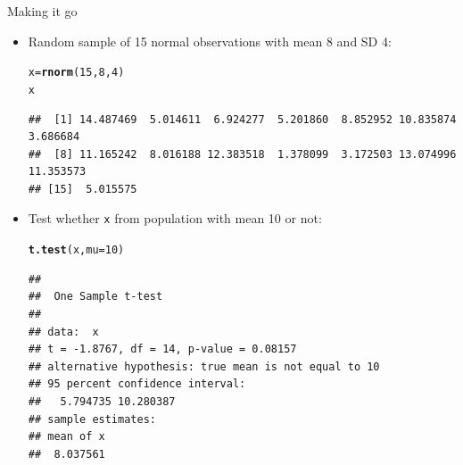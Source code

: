 \documentclass[unknownkeysallowed]{beamer}\usepackage[]{graphicx}\usepackage[]{color}
\makeatletter
\newcommand{\hlnum}[1]{\textcolor[rgb]{0.686,0.059,0.569}{#1}}%
\newcommand{\hlstd}[1]{\textcolor[rgb]{0.345,0.345,0.345}{#1}}%
\newcommand{\hlkwb}[1]{\textcolor[rgb]{0.69,0.353,0.396}{#1}}%
\newcommand{\hlkwc}[1]{\textcolor[rgb]{0.333,0.667,0.333}{#1}}%
\newcommand{\hlkwd}[1]{\textcolor[rgb]{0.737,0.353,0.396}{\textbf{#1}}}%
\newenvironment{kframe}{%
 \def\at@end@of@kframe{}%
 \ifinner\ifhmode%
  \def\at@end@of@kframe{\end{minipage}}%
  \begin{minipage}{\columnwidth}%
 \fi\fi%
 \def\FrameCommand##1{\hskip\@totalleftmargin \hskip-\fboxsep
 \colorbox{shadecolor}{##1}\hskip-\fboxsep
     \hskip-\linewidth \hskip-\@totalleftmargin \hskip\columnwidth}%
 \MakeFramed {\advance\hsize-\width
   \@totalleftmargin\z@ \linewidth\hsize
   \@setminipage}}%
 {\par\unskip\endMakeFramed%
 \at@end@of@kframe}
\newenvironment{knitrout}{}{} %
\makeatother
\begin{document}
\begin{frame}[fragile]{Making it go}
  
  \begin{itemize}
  \item Random sample of 15 normal observations with mean 8 and SD 4:


\begin{knitrout}\small
{}\color{fgcolor}\begin{kframe}
\begin{alltt}
\hlstd{x}\hlkwb{=}\hlkwd{rnorm}\hlstd{(}\hlnum{15}\hlstd{,}\hlnum{8}\hlstd{,}\hlnum{4}\hlstd{)}
\hlstd{x}
\end{alltt}
\begin{verbatim}
##  [1] 14.487469  5.014611  6.924277  5.201860  8.852952 10.835874  3.686684
##  [8] 11.165242  8.016188 12.383518  1.378099  3.172503 13.074996 11.353573
## [15]  5.015575
\end{verbatim}
\end{kframe}
\end{knitrout}
\item Test whether \texttt{x} from population with mean 10 or not:
\begin{knitrout}\small
{}\color{fgcolor}\begin{kframe}
\begin{alltt}
\hlkwd{t.test}\hlstd{(x,}\hlkwc{mu}\hlstd{=}\hlnum{10}\hlstd{)}
\end{alltt}
\begin{verbatim}
## 
## 	One Sample t-test
## 
## data:  x
## t = -1.8767, df = 14, p-value = 0.08157
## alternative hypothesis: true mean is not equal to 10
## 95 percent confidence interval:
##   5.794735 10.280387
## sample estimates:
## mean of x 
##  8.037561
\end{verbatim}
\end{kframe}
\end{knitrout}
  
  \end{itemize}
  
\end{frame}
\end{document}
